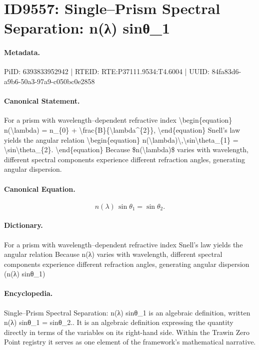 \section*{ID9557: Single–Prism Spectral Separation: n(λ) sinθ\_1}
\paragraph{Metadata.}
PiID: 6393833952942 | RTEID: RTE:P37111.9534:T4.6004 | UUID: 84fa83d6-a9b6-50a3-97a9-c050bc0e2858

\paragraph{Canonical Statement.}
For a prism with wavelength–dependent refractive index \textbackslash{}begin\{equation\} n(\textbackslash{}lambda) = n\_\{0\} + \textbackslash{}frac\{B\}\{\textbackslash{}lambda\textasciicircum{}\{2\}\}, \textbackslash{}end\{equation\} Snell's law yields the angular relation \textbackslash{}begin\{equation\} n(\textbackslash{}lambda)\textbackslash{},\textbackslash{}sin\textbackslash{}theta\_\{1\} = \textbackslash{}sin\textbackslash{}theta\_\{2\}. \textbackslash{}end\{equation\} Because \$n(\textbackslash{}lambda)\$ varies with wavelength, different spectral components experience different refraction angles, generating angular dispersion.

\paragraph{Canonical Equation.}
\[
n(\lambda)\,\sin\theta_{1} = \sin\theta_{2}.
\]

\paragraph{Dictionary.}
For a prism with wavelength–dependent refractive index Snell's law yields the angular relation Because n(λ) varies with wavelength, different spectral components experience different refraction angles, generating angular dispersion (n(λ) sinθ\_1)

\paragraph{Encyclopedia.}
Single–Prism Spectral Separation: n(λ) sinθ\_1 is an algebraic definition, written n(λ) sinθ\_1 = sinθ\_2.. It is an algebraic definition expressing the quantity directly in terms of the variables on its right-hand side. Within the Trawin Zero Point registry it serves as one element of the framework's mathematical narrative.
